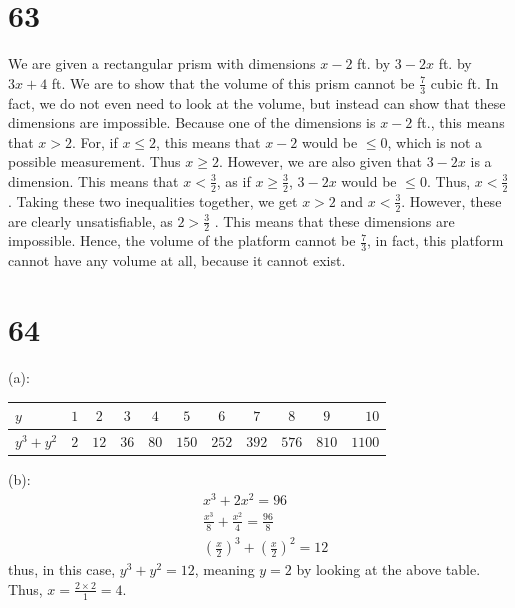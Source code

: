 \documentclass{article}
\theoremstyle{definition}
\begin{document}
\section*{63}


We are given a rectangular prism with dimensions $x-2$ ft. by $3-2x$ ft. by $3x+4$ ft. We are to show that the volume of this prism cannot be 
$\frac{7}{3}$ cubic ft. In fact, we do not even need to look at the volume, but instead can show that these dimensions are impossible. Because one of the 
dimensions is $x-2$ ft., this means that $x>2$. For, if $x\le 2$, this means that $x-2$ would be $\le 0$, which is not a possible measurement. Thus 
$x\ge 2$. However, we are also given that $3-2x$ is a dimension. This means that $x<\frac{3}{2}$, as if $x\ge\frac{3}{2}$, $3-2x$ would be $\le 0$. 
Thus, $x<\frac{3}{2}$. Taking these two inequalities together, we get $x>2$ and $x<\frac{3}{2}$. However, these are clearly unsatisfiable, as $2>\frac{3}{2}$
. This means that these dimensions are impossible. Hence, the volume of the platform cannot be $\frac{7}{3}$, in fact, this platform cannot have any 
volume at all, because it cannot exist.

\section*{64}


(a): \newline 
\FloatBarrier
\begin{table}[h!]
        \begin{center}
                \begin{tabular}{l|c|c|c|c|c|c|c|c|c|r}
                        $y$ & $1$ & $2$ & $3$ & $4$ & $5$ & $6$ & $7$ & $8$ & $9$ & $10$ \\
                        \hline
			$y^3+y^2$ & $2$ & $12$ & $36$ & $80$ & $150$ & $252$ & $392$ & $576$ & $810$ & $1100$
                \end{tabular}
        \end{center}
\end{table}
\FloatBarrier
(b): \newline
\[
\begin{array}{rl}
	& x^3+2x^2=96 \\
	& \frac{x^3}{8}+\frac{x^2}{4}=\frac{96}{8} \\
	& (\frac{x}{2})^3+(\frac{x}{2})^2=12
\end{array}
\]
thus, in this case, $y^3+y^2=12$, meaning $y=2$ by looking at the above table. Thus, $x=\frac{2\times 2}{1}=4$.\newline
\end{document}
